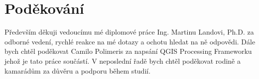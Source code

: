 \vfill

\vglue 14cm

\section*{Poděkování}
\indent\indent Především děkuji vedoucímu mé diplomové práce Ing. Martinu Landovi, Ph.D. za odborné vedení, rychlé reakce na mé dotazy a ochotu hledat na ně odpovědi. Dále bych chtěl poděkovat Camilo Polimeris za napsání QGIS Processing Frameworku jehož je tato práce součástí. V neposlední řadě bych chtěl poděkovat rodině a kamarádům za důvěru a podporu během studií.